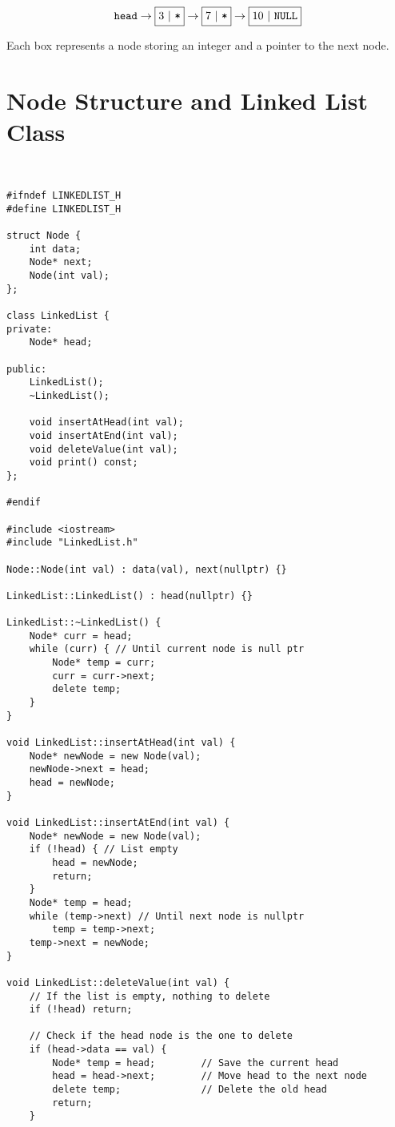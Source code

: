 \documentclass{article}
\begin{document}
\[
\texttt{head} \rightarrow 
\fbox{3\ $|$\ $\texttt{*}$} \rightarrow 
\fbox{7\ $|$\ $\texttt{*}$} \rightarrow 
\fbox{10\ $|$\ \texttt{NULL}}
\]

Each box represents a node storing an integer and a pointer to the next node.

\section{Node Structure and Linked List Class}

\begin{lstlisting}[style=cppstyle]


#ifndef LINKEDLIST_H
#define LINKEDLIST_H

struct Node {
    int data;
    Node* next;
    Node(int val);
};

class LinkedList {
private:
    Node* head;

public:
    LinkedList();
    ~LinkedList();

    void insertAtHead(int val);
    void insertAtEnd(int val);
    void deleteValue(int val);
    void print() const;
};

#endif

#include <iostream>
#include "LinkedList.h"

Node::Node(int val) : data(val), next(nullptr) {}

LinkedList::LinkedList() : head(nullptr) {}

LinkedList::~LinkedList() {
    Node* curr = head;
    while (curr) { // Until current node is null ptr
        Node* temp = curr;
        curr = curr->next;
        delete temp;
    }
}

void LinkedList::insertAtHead(int val) {
    Node* newNode = new Node(val);
    newNode->next = head;
    head = newNode;
}

void LinkedList::insertAtEnd(int val) {
    Node* newNode = new Node(val);
    if (!head) { // List empty
        head = newNode;
        return;
    }
    Node* temp = head;
    while (temp->next) // Until next node is nullptr
        temp = temp->next;
    temp->next = newNode;
}

void LinkedList::deleteValue(int val) {
    // If the list is empty, nothing to delete
    if (!head) return;

    // Check if the head node is the one to delete
    if (head->data == val) {
        Node* temp = head;        // Save the current head
        head = head->next;        // Move head to the next node
        delete temp;              // Delete the old head
        return;
    }


\end{lstlisting}
\end{document}
